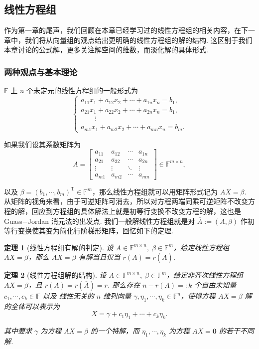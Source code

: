 \documentclass[10pt,openany]{article}
\theoremstyle{thmstyle} %
\newtheorem{theorem}{定理}[subsection]
\theoremstyle{defstyle} %
\theoremstyle{prostyle} %
\theoremstyle{exastyle}
\theoremstyle{remstyle}
\newcommand{\T}{^{\text{T}}}
\newcommand{\F}{\mathbb{F}}
\newcommand{\mn}{^{m \times n}}
\begin{document}
\subsection{线性方程组}

作为第一章的尾声，我们回顾在本章已经学习过的线性方程组的相关内容，在下一章中，我们将从向量组的观点给出更明确的线性方程组的解的结构. 这区别于我们本章讨论的公式解，更多关注解空间的维数，而淡化解的具体形式. 

\subsubsection{两种观点与基本理论}

\( \F \) 上 \( n \) 个未定元的线性方程组的一般形式为
\begin{equation}
	\left\{\begin{array}{l}
		a_{11}x_1+a_{12}x_2+\cdots+a_{1n}x_n=b_1, \\
		a_{21}x_1+a_{22}x_2+\cdots+a_{2n}x_n=b_1, \\
		\qquad \vdots \\
		a_{m1}x_1+a_{m2}x_2+\cdots+a_{mn}x_n=b_m.
	\end{array}\right.
	\label{linequ.}
\end{equation}

如果我们设其系数矩阵为
\[ A=\begin{bmatrix}
	a_{11} & a_{12} & \cdots & a_{1n} \\
	a_{21} & a_{22} & \cdots & a_{2n} \\
	\vdots & \vdots & \ddots & \vdots \\
	a_{m1} & a_{m2} & \cdots & a_{mn}
\end{bmatrix} \in \F^{m \times n}, \]

以及 \( \beta=(b_1,\cdots,b_m)\T \in \F^m \)，那么线性方程组就可以用矩阵形式记为 \( AX=\beta \). 从矩阵的视角来看，由于可逆矩阵可消去，所以对方程两端同乘可逆矩阵不改变方程的解，回应到方程组的具体解法上就是初等行变换不改变方程的解，这也是 Guass\(-\)Jordan 消元法的出发点. 我们一般解线性方程组就是对 \( \overline{A}:=(A,\beta) \) 作初等行变换使其变为简化行阶梯形矩阵，回忆如下的定理.

\begin{theorem}[线性方程组有解的判定]	\label{4.3.1}
	设 \( A \in \F\mn, \; \beta \in \F^m \)，给定线性方程组 \( AX=\beta \)，那么 \( AX=\beta \) 有解当且仅当 \( r(A)=r(\overline{A}) \).
\end{theorem}

\begin{theorem}[线性方程组解的结构]	\label{4.3.2}
	设 \( A \in \F\mn, \; \beta \in \F^m \)，给定非齐次线性方程组 \( AX=\beta \)，且 \( r(A)=r(\overline{A})=r \). 那么存在 \( n-r(A)=:k \) 个自由未知量 \( c_1,\cdots,c_{k} \in \F \) 以及{\color{blue} 线性无关的} \( n \) 维列向量 \( \gamma,\eta_1,\cdots,\eta_k \in \F^n \)，使得方程 \( AX=\beta \) 解的全体可以表示为
	\[ X=\gamma+c_1\eta_1+\cdots+c_k\eta_k. \] 
	
	其中要求 \( \gamma \) 为方程 \( AX=\beta \) 的一个特解，而 \( \eta_1,\cdots,\eta_k \) 为方程 \( AX=\bm{0} \) 的若干不同解.
\end{theorem}
\end{document}
